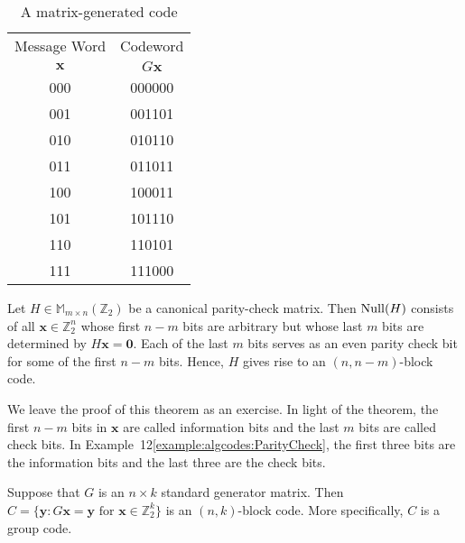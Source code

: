 
\begin{table}[htb]
{\small
\begin{center}
\begin{tabular}{|c|c|}
\hline
Message Word  & Codeword \\
${\mathbf x}$ & $G {\mathbf x}$ \\ \hline
000 & 000000 \\
001 & 001101 \\
010 & 010110 \\
011 & 011011 \\
100 & 100011 \\
101 & 101110 \\
110 & 110101 \\
111 & 111000 \\
\hline
\end{tabular}
\end{center}\label{matrix_gen_code}
}
\caption{A matrix-generated code}
\end{table}
 
 
\begin{theorem}
Let $H \in {\mathbb M}_{m \times n}({\mathbb Z}_2)$ be a canonical
parity-check matrix. Then ${\rm Null}(H)$ consists of all 
${\mathbf x} \in {\mathbb
Z}_2^n$ whose first $n-m$ bits are arbitrary but whose last $m$ bits
are determined by $H{\mathbf x} = {\mathbf 0}$. Each of
the last $m$ bits serves as an even parity check bit for some of the
first $n-m$ bits. Hence, $H$ gives rise to an $(n, n-m)$-block code. 
\end{theorem}
 
 
We leave the proof of this theorem as an exercise. In light of the
theorem, the first $n - m$ bits in ${\mathbf x}$ are called {\bfi
information bits\/} and the last $m$ bits are called {\bfi check bits}.
In Example~12\ref{example:algcodes:ParityCheck},  %
the first three bits are the information bits
and the last three are the check bits.
 
 
\begin{theorem}
Suppose that $G$ is an $n \times k$  standard generator matrix.  Then
\mbox{$C = \{ {\mathbf y} : G {\mathbf x} ={\mathbf y} \mbox{ for ${\mathbf x} \in
{\mathbb  Z}_2^k$} \}$} is an  $(n,k)$-block code. More specifically, $C$
is a group code.  
\end{theorem}
 
